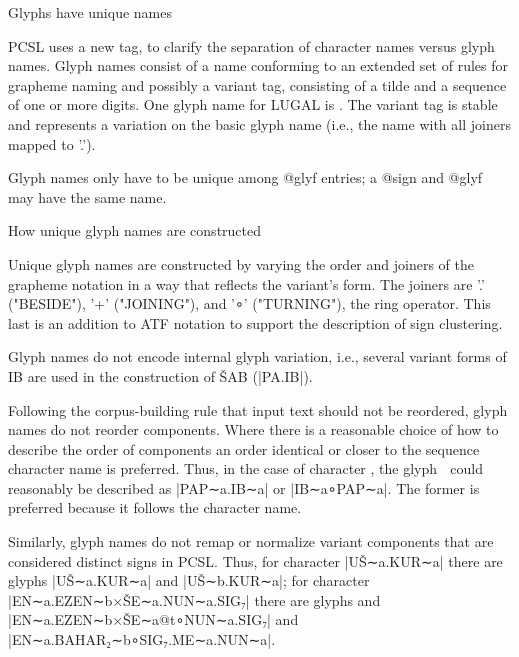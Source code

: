 \Hh{}Glyphs have unique names


\par PCSL uses a new tag,  to clarify the
      separation of character names versus glyph names.  Glyph names
      consist of a name conforming to an extended set of rules for
      grapheme naming and possibly a variant tag, consisting of a
      tilde and a sequence of one or more digits.  One glyph name for
      LUGAL is .  The variant tag is
      stable and represents a variation on the basic glyph name (i.e.,
      the name with all joiners mapped to '.').


\par Glyph names only have to be unique among @glyf entries; a
      @sign and @glyf may have the same name.

\Hhh{}How unique glyph names are constructed


\par Unique glyph names are constructed by varying the order and
      joiners of the grapheme notation in a way that reflects the
      variant's form. The joiners are '.' ("BESIDE"), '+' ("JOINING"),
      and '∘' ("TURNING"), the ring operator. This last is an addition
      to ATF notation to support the description of sign clustering.


\par Glyph names do not encode internal glyph variation, i.e.,
      several variant forms of IB are used in the construction of ŠAB
      (|PA.IB|).


\par Following the corpus-building rule that input text should not
      be reordered, glyph names do not reorder components.  Where
      there is a reasonable choice of how to describe the order of
      components an order identical or closer to the sequence
      character name is preferred.  Thus, in the case of character
      , the glyph 𒭅 could reasonably be
      described as |PAP∼a.IB∼a| or |IB∼a∘PAP∼a|.  The former is
      preferred because it follows the character name.


\par Similarly, glyph names do not remap or normalize variant
      components that are considered distinct signs in PCSL.  Thus,
      for character |UŠ∼a.KUR∼a| there are glyphs |UŠ∼a.KUR∼a| and
      |UŠ∼b.KUR∼a|; for character |EN∼a.EZEN∼b×ŠE∼a.NUN∼a.SIG₇| there
      are glyphs and |EN∼a.EZEN∼b×ŠE∼a@t∘NUN∼a.SIG₇| and
      |EN∼a.BAHAR₂∼b∘SIG₇.ME∼a.NUN∼a|.

